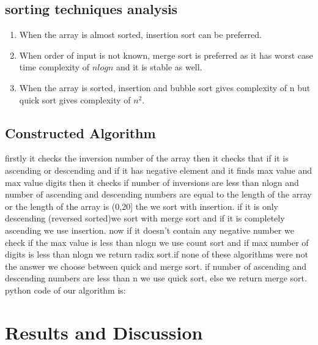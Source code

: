 \documentclass[
10pt, %
a4paper, %
oneside, %
headinclude,footinclude, %
BCOR5mm, %
]{scrartcl}
\begin{document}
\subsection{sorting techniques analysis}

\begin{enumerate}[noitemsep]
\item When the array is almost sorted, insertion sort can be preferred.
\item When order of input is not known, merge sort is preferred as it has worst case time complexity of $nlogn$ and it is stable as well.
\item When the array is sorted, insertion and bubble sort gives complexity of n but quick sort gives complexity of $n^2$.

\end{enumerate}






\subsection{Constructed Algorithm}
 firstly it checks the inversion number of the array then it checks that if it is ascending or descending and if it has negative element and it finds max value and max value digits then it checks if number of inversions are less  than nlogn and number of ascending and descending numbers are equal to the length of the array or the length of the array is (0,20] the we sort with insertion. 
 if it is only descending (reversed sorted)we sort with merge sort and if it is completely ascending we use insertion.
 now if it doesn't contain any negative number we check if the max value is less than nlogn we use count sort and if max number of digits is less than nlogn we return radix sort.if none of these algorithms were not the answer we choose between quick and merge sort. if number of ascending and descending numbers are less than n we use quick sort, else we return merge sort.
 \\
python code of our algorithm is:






 


\section{Results and Discussion}
\end{document}
